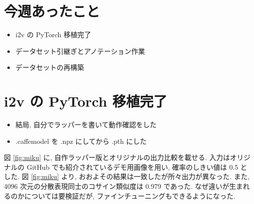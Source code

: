 \documentclass{jarticle}     %
\begin{document}



\section{今週あったこと}
\begin{itemize}
  \item i2v の PyTorch 移植完了
  \item データセット引継ぎとアノテーション作業
  \item データセットの再構築
\end{itemize}

\section{i2v の PyTorch 移植完了}
\begin{itemize}
  \item 結局, 自分でラッパーを書いて動作確認をした
  \item .caffemodel を .npz にしてから .pth にした
\end{itemize}

図 \ref{fig:miku} に, 自作ラッパー版とオリジナルの出力比較を載せる. 入力はオリジナルの GitHub でも紹介されているデモ用画像を用い, 確率のしきい値は 0.5 とした. 図 \ref{fig:miku} より, おおよその結果は一致したが所々出力が異なった. また, 4096 次元の分散表現同士のコサイン類似度は 0.979 であった. なぜ違いが生まれるのかについては要検証だが, ファインチューニングもできるようになった.
\end{document}
